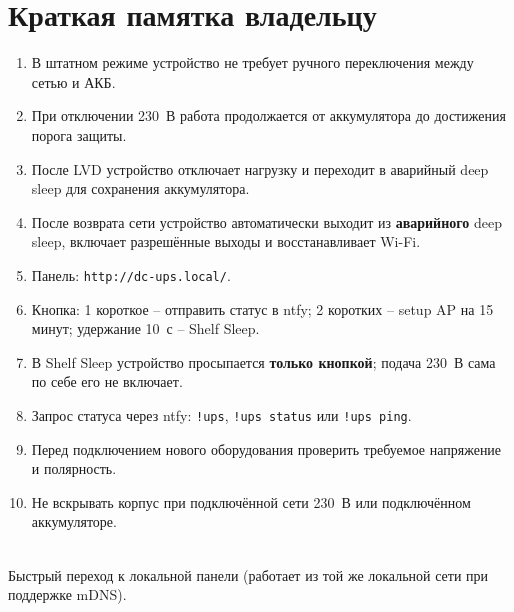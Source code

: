 \documentclass[11pt,a4paper]{article}
\begin{document}
\newpage
\section{Краткая памятка владельцу}
\begin{enumerate}[leftmargin=8mm]
  \item В штатном режиме устройство не требует ручного переключения между сетью и АКБ.
  \item При отключении 230~В работа продолжается от аккумулятора до достижения порога защиты.
  \item После LVD устройство отключает нагрузку и переходит в аварийный deep sleep для сохранения аккумулятора.
  \item После возврата сети устройство автоматически выходит из \textbf{аварийного} deep sleep, включает разрешённые выходы и восстанавливает Wi-Fi.
  \item Панель: \texttt{http://dc-ups.local/}.
  \item Кнопка: 1 короткое -- отправить статус в ntfy; 2 коротких -- setup AP на 15 минут; удержание 10~с -- Shelf Sleep.
  \item В Shelf Sleep устройство просыпается \textbf{только кнопкой}; подача 230~В сама по себе его не включает.
  \item Запрос статуса через ntfy: \texttt{!ups}, \texttt{!ups status} или \texttt{!ups ping}.
  \item Перед подключением нового оборудования проверить требуемое напряжение и полярность.
  \item Не вскрывать корпус при подключённой сети 230~В или подключённом аккумуляторе.
\end{enumerate}

\begin{center}
\vfill
{}\\[2mm]
{\small Быстрый переход к локальной панели (работает из той же локальной сети при поддержке mDNS).}
\end{center}
\end{document}
